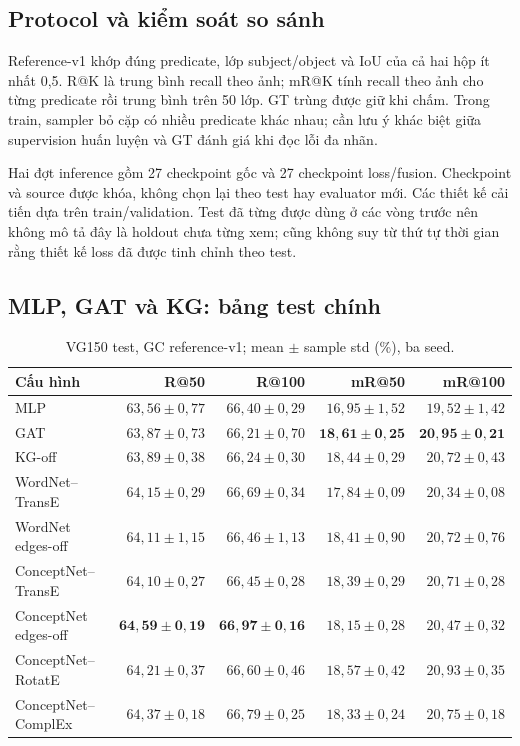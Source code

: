 \subsection{Protocol và kiểm soát so sánh}
Reference-v1 khớp đúng predicate, lớp subject/object và IoU của cả hai hộp
ít nhất 0,5. R@K là trung bình recall theo ảnh; mR@K tính recall theo ảnh
cho từng predicate rồi trung bình trên 50 lớp. GT trùng được giữ khi chấm.
Trong train, sampler bỏ cặp có nhiều predicate khác nhau; cần lưu ý khác biệt
giữa supervision huấn luyện và GT đánh giá khi đọc lỗi đa nhãn.

Hai đợt inference gồm 27 checkpoint gốc và 27 checkpoint loss/fusion.
Checkpoint và source được khóa, không chọn lại theo test hay evaluator mới.
Các thiết kế cải tiến dựa trên train/validation. Test đã từng được dùng ở các
vòng trước nên không mô tả đây là holdout chưa từng xem; cũng không suy từ
thứ tự thời gian rằng thiết kế loss đã được tinh chỉnh theo test.

\clearpage
\subsection{MLP, GAT và KG: bảng test chính}
\begin{table}[H]\centering\small
\caption{VG150 test, GC reference-v1; mean $\pm$ sample std (\%), ba seed.}\label{tab:vgmain}
\begin{tabular}{@{}lrrrr@{}}\toprule
Cấu hình & R@50 & R@100 & mR@50 & mR@100\\\midrule
MLP & $63,56\pm0,77$ & $66,40\pm0,29$ & $16,95\pm1,52$ & $19,52\pm1,42$\\
GAT & $63,87\pm0,73$ & $66,21\pm0,70$ & $\mathbf{18,61\pm0,25}$ & $\mathbf{20,95\pm0,21}$\\
KG-off & $63,89\pm0,38$ & $66,24\pm0,30$ & $18,44\pm0,29$ & $20,72\pm0,43$\\
WordNet--TransE & $64,15\pm0,29$ & $66,69\pm0,34$ & $17,84\pm0,09$ & $20,34\pm0,08$\\
WordNet edges-off & $64,11\pm1,15$ & $66,46\pm1,13$ & $18,41\pm0,90$ & $20,72\pm0,76$\\
ConceptNet--TransE & $64,10\pm0,27$ & $66,45\pm0,28$ & $18,39\pm0,29$ & $20,71\pm0,28$\\
ConceptNet edges-off & $\mathbf{64,59\pm0,19}$ & $\mathbf{66,97\pm0,16}$ & $18,15\pm0,28$ & $20,47\pm0,32$\\
ConceptNet--RotatE & $64,21\pm0,37$ & $66,60\pm0,46$ & $18,57\pm0,42$ & $20,93\pm0,35$\\
ConceptNet--ComplEx & $64,37\pm0,18$ & $66,79\pm0,25$ & $18,33\pm0,24$ & $20,75\pm0,18$\\
\bottomrule\end{tabular}\end{table}

